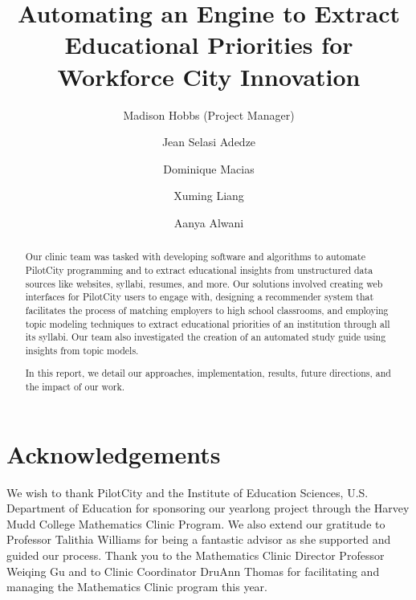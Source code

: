 \documentclass[mathematics,finalreport]{hmcclinic}
\title{Automating an Engine to Extract Educational Priorities for Workforce City Innovation}
\author{Madison Hobbs (Project Manager) \and Jean Selasi Adedze \and Dominique Macias \and
  Xuming Liang \and Aanya Alwani}
\begin{document}
\frontmatter


\maketitle




\begin{abstract}
  Our clinic team was tasked with developing software and algorithms to automate PilotCity programming and to extract educational insights from unstructured data sources like websites, syllabi, resumes, and more. Our solutions involved creating web interfaces for PilotCity users to engage with, designing a recommender system that facilitates the process of matching employers to high school classrooms, and employing topic modeling techniques to extract educational priorities of an institution through all its syllabi. Our team also investigated the creation of an automated study guide using insights from topic models.

  In this report, we detail our approaches, implementation, results, future directions, and the impact of our work.
\end{abstract}

\chapter*{Acknowledgements}
We wish to thank PilotCity and the Institute of Education Sciences, U.S. Department of Education for sponsoring our yearlong project through the Harvey Mudd College Mathematics Clinic Program. We also extend our gratitude to Professor Talithia Williams for being a fantastic advisor as she supported and guided our process. Thank you to the Mathematics Clinic Director Professor Weiqing Gu and to Clinic Coordinator DruAnn Thomas for facilitating and managing the Mathematics Clinic program this year.
\end{document}
